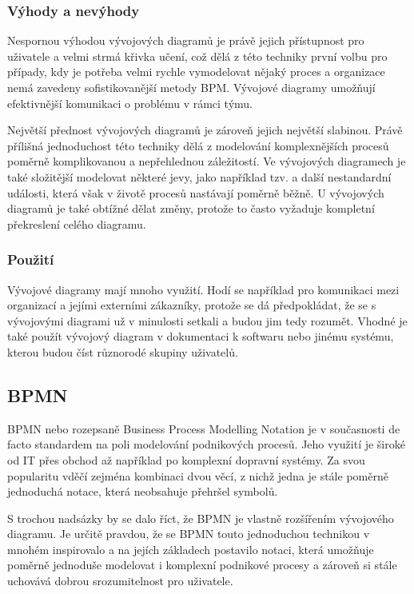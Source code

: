 \documentclass[]{article}
\begin{document}
\subsubsection{Výhody a nevýhody}
Nespornou výhodou vývojových diagramů je právě jejich přístupnost pro uživatele a velmi strmá křivka učení, což dělá z této techniky první volbu pro případy, kdy je potřeba velmi rychle vymodelovat nějaký proces a organizace nemá zavedeny sofistikovanější metody BPM. Vývojové diagramy umožňují efektivnější komunikaci o problému v rámci týmu. 

Největší přednost vývojových diagramů je zároveň jejich největší slabinou. Právě přílišná jednoduchost této techniky dělá z modelování komplexnějších procesů poměrně komplikovanou a nepřehlednou záležitostí. Ve vývojových diagramech je také složitější modelovat některé jevy, jako například tzv.  a další nestandardní události, která však v životě procesů nastávají poměrně běžně. U vývojových diagramů je také obtížné dělat změny, protože to často vyžaduje kompletní překreslení celého diagramu.

\subsubsection{Použití}
Vývojové diagramy mají mnoho využití. Hodí se například pro komunikaci mezi organizací a jejími externími zákazníky, protože se dá předpokládat, že se s vývojovými diagrami už v minulosti setkali a budou jim tedy rozumět. Vhodné je také použít vývojový diagram v dokumentaci k softwaru nebo jinému systému, kterou budou číst různorodé skupiny uživatelů.

\subsection{BPMN}
BPMN nebo rozepsaně Business Process Modelling Notation je v současnosti de facto standardem na poli modelování podnikových procesů. Jeho využití je široké od IT přes obchod až například po komplexní dopravní systémy. Za svou popularitu vděčí zejména kombinaci dvou věcí, z nichž jedna je stále poměrně jednoduchá notace, která neobsahuje přehršel symbolů.

S trochou nadsázky by se dalo říct, že BPMN je vlastně rozšířením vývojového diagramu. Je určitě pravdou, že se BPMN touto jednoduchou technikou v mnohém inspirovalo a na jejích základech postavilo notaci, která umožňuje poměrně jednoduše modelovat i komplexní podnikové procesy a zároveň si stále uchovává dobrou srozumitelnost pro uživatele.
\end{document}
